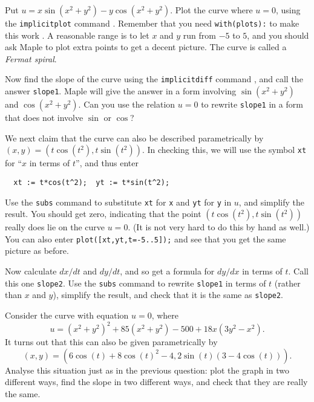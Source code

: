 \documentclass[a4paper,10pt]{amsbook}
\numberwithin{example}{chapter}
\begin{document}
\begin{exercise}\label{ex-fermat-spiral}
 Put $u=x\sin(x^2+y^2)-y\cos(x^2+y^2)$.  Plot the curve
 where $u=0$, using the \verb+implicitplot+ command
 \note{\NOTEimplicitplot} .  Remember that you need
 \verb~with(plots):~ to make this work
 \note{\NOTEwithplots}.  A reasonable range is to let $x$
 and $y$ run from $-5$ to $5$, and you should ask Maple to
 plot extra points \note{\NOTEgrid} to get a decent picture.
 The curve is called a \emph{Fermat spiral}.

 Now find the slope of the curve using the
 \verb+implicitdiff+ command \note{\NOTEimplicitdiff}, and
 call the answer \verb+slope1+.  Maple will give the answer
 in a form involving $\sin(x^2+y^2)$ and $\cos(x^2+y^2)$.
 Can you use the relation $u=0$ to rewrite \verb+slope1+ in
 a form that does not involve $\sin$ or $\cos$?

 We next claim that the curve can also be described
 parametrically by $(x,y)=(t\cos(t^2),t\sin(t^2))$.  In
 checking this, we will use the symbol \verb~xt~ for ``$x$
 in terms of $t$'', and thus enter
\begin{verbatim}
  xt := t*cos(t^2);  yt := t*sin(t^2);
\end{verbatim}
 Use the \verb~subs~ command \note{\NOTEsubs} to substitute
 \verb~xt~ for \verb~x~ and \verb~yt~ for \verb~y~ in $u$,
 and simplify the result.  You should get zero, indicating
 that the point $(t\cos(t^2),t\sin(t^2))$ really does lie on
 the curve $u=0$.  (It is not very hard to do this by hand
 as well.)  You can also enter \verb~plot([xt,yt,t=-5..5]);~
 and see that you get the same picture as before. 

 Now calculate $dx/dt$ and $dy/dt$, and so get a formula for
 $dy/dx$ in terms of $t$.  Call this one \verb~slope2~.  Use
 the \verb~subs~ command to rewrite \verb~slope1~ in terms
 of $t$ (rather than $x$ and $y$), simplify the result, and
 check that it is the same as \verb~slope2~. 
\end{exercise}

\begin{exercise}\label{ex-trefoil}
 Consider the curve with equation $u=0$, where
 \[ u = (x^2+y^2)^2 + 85(x^2+y^2) - 500 + 18x(3y^2-x^2). \]
 It turns out that this can also be given parametrically by 
 \[ (x,y) =
     (6\cos(t) + 8\cos(t)^2 - 4, 2\sin(t)(3-4\cos(t))). 
 \]
 Analyse this situation just as in the previous question:
 plot the graph in two different ways, find the slope in two
 different ways, and check that they are really the same. 
\end{exercise}
\end{document}
